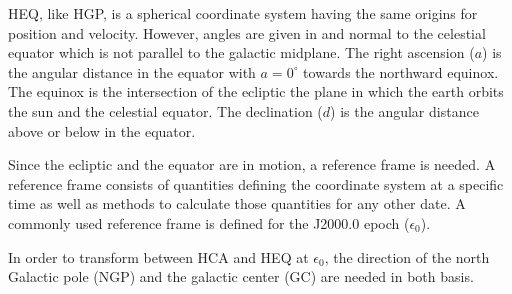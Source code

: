 \documentclass[letterpaper,10pt,english]{sphinxmanual}
\begin{document}
\sphinxAtStartPar
HEQ, like HGP, is a spherical coordinate system having the same origins for position and velocity.
However, angles are given in and normal to the celestial equator which is not parallel to the galactic midplane.
The right ascension (\(a\)) is the angular distance in the equator with \(a=0^{\circ}\) towards the northward equinox.
The equinox is the intersection of the ecliptic \sphinxhyphen{} the plane in which the earth orbits the sun \sphinxhyphen{} and the celestial equator.
The declination (\(d\)) is the angular distance above or below in the equator.

\sphinxAtStartPar
Since the ecliptic and the equator are in motion, a reference frame is needed.
A reference frame consists of quantities defining the coordinate system at a specific time as well as methods to
calculate those quantities for any other date. A commonly used reference frame is defined for the J2000.0 epoch (\(\epsilon_0\)).

\sphinxAtStartPar
In order to transform between HCA and HEQ at \(\epsilon_0\),
the direction of the north Galactic pole (NGP) and the galactic center (GC) are needed in both basis.
\end{document}
